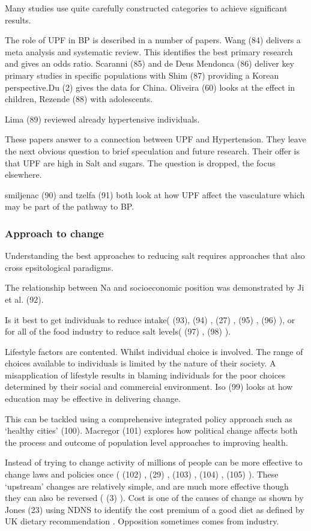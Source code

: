 \documentclass[
]{article}
\begin{document}
Many studies use quite carefully constructed categories to achieve
significant results.

The role of UPF in BP is described in a number of papers. Wang (84)
delivers a meta analysis and systematic review. This identifies the best
primary research and gives an odds ratio. Scaranni (85) and de Deus
Mendonca (86) deliver key primary studies in specific populations with
Shim (87) providing a Korean perspective.Du (2) gives the data for
China. Oliveira (60) looks at the effect in children, Rezende (88) with
adolescents.

Lima (89) reviewed already hypertensive individuals.

These papers answer to a connection between UPF and Hypertension. They
leave the next obvious question to brief speculation and future
research. Their offer is that UPF are high in Salt and sugars. The
question is dropped, the focus elsewhere.

smiljenac (90) and tzelfa (91) both look at how UPF affect the
vasculature which may be part of the pathway to BP.

\hypertarget{approach-to-change}{%
\subsubsection{Approach to change}\label{approach-to-change}}

Understanding the best approaches to reducing salt requires approaches
that also cross epsitological paradigms.

The relationship between Na and socioeconomic position was demonstrated
by Ji et al. (92).

Is it best to get individuals to reduce intake( (93), (94) , (27) , (95)
, (96) ), or for all of the food industry to reduce salt levels( (97) ,
(98) ).

Lifestyle factors are contented. Whilst individual choice is involved.
The range of choices available to individuals is limited by the nature
of their society. A misapplication of lifestyle results in blaming
individuals for the poor choices determined by their social and
commercial environment. Iso (99) looks at how education may be effective
in delivering change.

This can be tackled using a comprehensive integrated policy approach
such as `healthy cities' (100). Macregor (101) explores how political
change affects both the process and outcome of population level
approaches to improving health.

Instead of trying to change activity of millions of people can be more
effective to change laws and policies once ( (102) , (29) , (103) ,
(104) , (105) ). These `upstream' changes are relatively simple, and are
much more effective though they can also be reversed ( (3) ). Cost is
one of the causes of change as shown by Jones (23) using NDNS to
identify the cost premium of a good diet as defined by UK dietary
recommendation . Opposition sometimes comes from industry.
\end{document}
